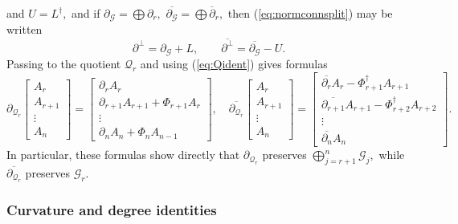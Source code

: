 \documentclass[11pt]{article}
\theoremstyle{definition}
\newcommand{\delbar}{\overline{\partial}}
\numberwithin{equation}{section}
\begin{document}
and $U = L^{\dagger},$ and if $\partial_{\mathcal{G}} = \bigoplus \partial_r,$ $\overline{\partial_{\mathcal{G}}} = \bigoplus \delbar_r,$ then (\ref{eq:normconnsplit}) may be written
\begin{equation*}
	\partial^{\perp} = \partial_{\mathcal{G}} + L, \qquad \overline{\partial^{\perp}} = \overline{\partial_{\mathcal{G}}} - U.
\end{equation*}
Passing to the quotient $\mathcal{Q}_r$ and using (\ref{eq:Qident}) gives formulas
\begin{equation}\label{eq:Qconn}
	\partial_{\mathcal{Q}_r} \begin{bmatrix}
	A_r \\
	A_{r+1} \\
	\vdots \\
	A_n
	\end{bmatrix} = \begin{bmatrix}
	\partial_r A_r \\
	\partial_{r+1} A_{r+1} + \Phi_{r+1} A_r \\
	\vdots \\
	\partial_n A_n + \Phi_n A_{n-1}
	\end{bmatrix}, \quad \overline{\partial_{\mathcal{Q}_r}} \begin{bmatrix}
	A_r \\
	A_{r+1} \\
	\vdots \\
	A_n
	\end{bmatrix} = \begin{bmatrix}
	\overline{\partial_r} A_r - \Phi_{r+1}^\dagger A_{r+1} \\
	\overline{\partial_{r+1}} A_{r+1} - \Phi_{r+2}^\dagger A_{r+2} \\
	\vdots \\
	\overline{\partial_n} A_n
	\end{bmatrix}.
\end{equation}
In particular, these formulas show directly that $\partial_{\mathcal{Q}_r}$ preserves $\bigoplus_{j=r+1}^{n} \mathcal{G}_j,$ while $\overline{\partial_{\mathcal{Q}_r}}$ preserves $\mathcal{G}_r.$

\subsubsection{Curvature and degree identities}
\end{document}
